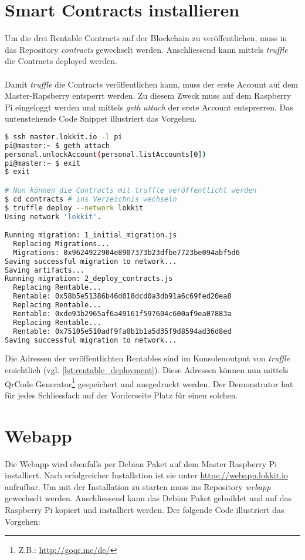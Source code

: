 \section{Smart Contracts installieren}
Um die drei Rentable Contracts auf der Blockchain zu veröffentlichen, muss in das Repository \emph{contracts} gewechselt werden. Anschliessend kann mittels \emph{truffle} die Contracts deployed werden. 

\paragraph{}
Damit \emph{truffle} die Contracts veröffentlichen kann, muss der erste Account auf dem Master-Rapsberry entsperrt werden. Zu diesem Zweck muss auf dem Raspberry Pi eingeloggt werden und mittels \emph{geth attach} der erste Account entsprerren. Das untenstehende Code Snippet illustriert das Vorgehen. 

\begin{lstlisting}[language=bash,label={lst:rentable_deployment},caption={Deployment der Contracts}]
$ ssh master.lokkit.io -l pi 
pi@master:~ $ geth attach
personal.unlockAccount(personal.listAccounts[0])
pi@master:~ $ exit
$ exit

# Nun können die Contracts mit truffle veröffentlicht werden
$ cd contracts # ins Verzeichnis wechseln
$ truffle deploy --network lokkit
Using network 'lokkit'.

Running migration: 1_initial_migration.js
  Replacing Migrations...
  Migrations: 0x9624922904e8907373b23dfbe7723be094abf5d6
Saving successful migration to network...
Saving artifacts...
Running migration: 2_deploy_contracts.js
  Replacing Rentable...
  Rentable: 0x58b5e51386b46d018dcd0a3db91a6c69fed20ea8
  Replacing Rentable...
  Rentable: 0xde93b2965af6a49161f597604c600af9ea07883a
  Replacing Rentable...
  Rentable: 0x75105e510adf9fa0b1b1a5d35f9d8594ad36d8ed
Saving successful migration to network...
\end{lstlisting}

\noindent 
Die Adressen der veröffentlichten Rentables sind im Konsolenoutput von \emph{truffle} ersichtlich (vgl. \ref{lst:rentable_deployment}). Diese Adressen können nun mittels QrCode Generator\footnote{Z.B.: \url{http://goqr.me/de/}} gespeichert und ausgedruckt werden. Der Demonstrator hat für jedes Schliessfach auf der Vorderseite Platz für einen solchen.

\section{Webapp}
Die Webapp wird ebenfalls per Debian Paket auf dem Master Raspberry Pi installiert. Nach erfolgreicher Installation ist sie unter \url{https://webapp.lokkit.io} aufrufbar. Um mit der Installation zu starten muss ins Repository \emph{webapp} gewechselt werden. Anschliessend kann das Debian Paket gebuildet und auf das Raspberry Pi kopiert und installiert werden. Der folgende Code illustriert das Vorgehen:

